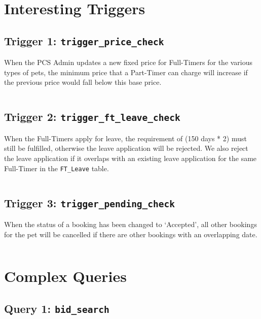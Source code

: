 \documentclass[10pt]{article}
\begin{document}
\section{Interesting Triggers}
\subsection{Trigger 1: \texttt{trigger\_price\_check}}
When the PCS Admin updates a new fixed price for Full-Timers for the various types of pets, the minimum price that a Part-Timer can charge will increase if the previous price would fall below this base price.
\begin{figure}[H]
\inputminted[breaklines, tabsize=8, obeytabs, fontsize=\footnotesize]{postgresql}{./codes/trigger_price_check.sql}
\end{figure}

\newpage
\subsection{Trigger 2: \texttt{trigger\_ft\_leave\_check}}
When the Full-Timers apply for leave, the requirement of (150 days * 2) must still be fulfilled, otherwise the leave application will be rejected. We also reject the leave application if it overlaps with an existing leave application for the same Full-Timer in the \texttt{FT\_Leave} table.
\begin{figure}[H]
\inputminted[breaklines, tabsize=8, obeytabs, fontsize=\footnotesize]{postgresql}{./codes/trigger_ft_leave_check.sql}
\end{figure}

\newpage
\subsection{Trigger 3: \texttt{trigger\_pending\_check}}
When the status of a booking has been changed to `Accepted', all other bookings for the pet will be cancelled if there are other bookings with an overlapping date.
\begin{figure}[H]
\inputminted[breaklines, tabsize=8, obeytabs, fontsize=\footnotesize]{postgresql}{./codes/trigger_pending_check.sql}
\end{figure}


\section{Complex Queries}

\subsection{Query 1: \texttt{bid\_search}}
\begin{figure}[H]
\inputminted[breaklines, tabsize=8, obeytabs, fontsize=\footnotesize]{postgresql}{./codes/query_bid_search.sql}
\end{figure}
\end{document}
